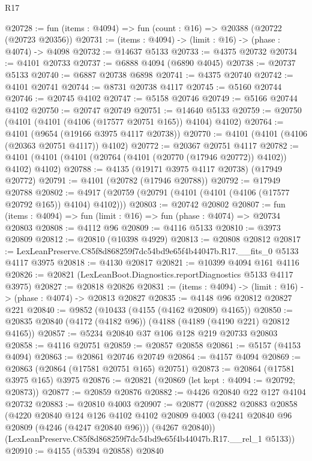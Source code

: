 \begin{lexlean}{R17}
\begin{coremodule}
@20728 := fun (items : @4094) => fun (count : @16) => @20388 (@20722 (@20723 @20356))
@20731 := (items : @4094) -> (limit : @16) -> (phase : @4074) -> @4098
@20732 := @14637 @5133
@20733 := @4375 @20732
@20734 := @4101 @20733
@20737 := @6888 @4094 (@6890 @4045)
@20738 := @20737 @5133
@20740 := @6887 @20738 @6898
@20741 := @4375 @20740
@20742 := @4101 @20741
@20744 := @8731 @20738 @4117
@20745 := @5160 @20744
@20746 := @20745 @4102
@20747 := @5158 @20746
@20749 := @5166 @20744 @4102
@20750 := @20747 @20749
@20751 := @14640 @5133
@20759 := @20750 (@4101 (@4101 (@4106 (@17577 @20751 @165)) @4104) @4102)
@20764 := @4101 (@9654 (@19166 @3975 @4117 @20738))
@20770 := @4101 (@4101 (@4106 (@20363 @20751 @4117)) @4102)
@20772 := @20367 @20751 @4117
@20782 := @4101 (@4101 (@4101 (@20764 (@4101 (@20770 (@17946 @20772)) @4102)) @4102) @4102)
@20788 := @4135 (@19171 @3975 @4117 @20738) (@17949 @20772)
@20791 := @4101 (@20782 (@17946 @20788))
@20792 := @17949 @20788
@20802 := @4917 (@20759 (@20791 (@4101 (@4101 (@4106 (@17577 @20792 @165)) @4104) @4102)))
@20803 := @20742 @20802
@20807 := fun (items : @4094) => fun (limit : @16) => fun (phase : @4074) => @20734 @20803
@20808 := @4112 @96
@20809 := @4116 @5133
@20810 := @3973 @20809
@20812 := @20810 (@10398 @4929)
@20813 := @20808 @20812
@20817 := LexLeanPreserve.C85f8d868259f7dc54bd9e65f4b44047b.R17.__fits_0 @5133 @4117 @3975
@20818 := @4130 @20817
@20821 := @10399 @4094 @161 @4116
@20826 := @20821 (LexLeanBoot.Diagnostics.reportDiagnostics @5133 @4117 @3975)
@20827 := @20818 @20826
@20831 := (items : @4094) -> (limit : @16) -> (phase : @4074) -> @20813 @20827
@20835 := @4148 @96 @20812 @20827 @221
@20840 := @9852 (@10433 (@4155 (@4162 @20809) @4165))
@20850 := @20835 @20840 (@4172 (@4182 @96)) (@4188 (@4189 (@4190 @221) @20812 @4165))
@20857 := @5234 @20840 @37 @106 @128 @219 @20733 @20803
@20858 := @4116 @20751
@20859 := @20857 @20858
@20861 := @5157 (@4153 @4094)
@20863 := @20861 @20746 @20749
@20864 := @4157 @4094
@20869 := @20863 (@20864 (@17581 @20751 @165) @20751)
@20873 := @20864 (@17581 @3975 @165) @3975
@20876 := @20821 (@20869 (let kept : @4094 := @20792; @20873))
@20877 := @20859 @20876
@20882 := @4426 @20840 @22 @127 @4104 @20732
@20883 := @20810 @4003
@20907 := @20877
    (@20882
      @20883
      @20858
      (@4220
        @20840
        @124
        @126
        @4102
        @4102
        @20809
        @4003
        (@4241 @20840 @96 @20809 (@4246 (@4247 @20840 @96)))
        (@4267 @20840))
      (LexLeanPreserve.C85f8d868259f7dc54bd9e65f4b44047b.R17.__rel_1 @5133))
@20910 := @4155 (@5394 @20858) @20840

\end{coremodule}
\end{lexlean}
